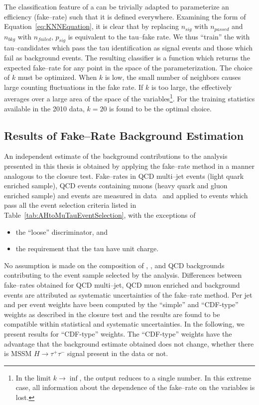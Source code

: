 The classification feature of a \kNN can be trivially adapted to parameterize an
efficiency (fake--rate) such that it is defined everywhere.  Examining the form
of Equation~\ref{eq:KNNEquation}, it is clear that by replacing $n_{sig}$ with
$n_{passed}$ and $n_{bkg}$ with $n_{failed}$, $p_{sig}$ is equivalent to the
tau--fake rate.  We thus ``train'' the \kNN with tau--candidates which pass the
tau identification as signal events and those which fail as background events.
The resulting classifier is a function which returns the expected fake--rate for
any point in the space of the parameterization.  The choice of $k$ must be
optimized.  When $k$ is low, the small number of neighbors causes large counting
fluctuations in the fake rate.  If $k$ is too large, the \kNN effectively
averages over a large area of the space of the variables\footnote{In the limit
$k\to\inf$, the \kNN output reduces to a single number.  In this extreme case,
all information about the dependence of the fake--rate on the variables is
lost.}.  For the training statistics available in the 2010 data, $k=20$ is found
to be the optimal choice.

\subsection{Results of Fake--Rate Background Estimation}
%
An independent estimate of the background contributions to the analysis
presented in this thesis is obtained by applying the fake--rate method in a
manner analogous to the closure test.  Fake--rates in QCD multi--jet events
(light quark enriched sample), QCD events containing muons (heavy quark and
gluon enriched sample) and \WpJets events are measured in
data~\cite{CMS-PAS-PFT-10-004,CMS-PAS-TAU-11-001} and applied to events which
pass all the event selection criteria listed in
Table~\ref{tab:AHtoMuTauEventSelection}, with the exceptions of 
\begin{itemize}
  \item the ``loose'' \hpsTanc discriminator, and
  \item the requirement that the tau have unit charge.
\end{itemize}

No assumption is made on the composition of \ZMM, \WpJets,
\ttbarpJets and QCD backgrounds contributing to the event sample selected
by the analysis.  Differences between fake--rates obtained for QCD multi--jet,
QCD muon enriched and \WpJets background events are attributed as systematic
uncertainties of the fake--rate method.  Per jet and per event weights have been
computed by the ``simple'' and ``CDF-type'' weights as described
in the closure test and the results are found to be compatible within
statistical and systematic uncertainties.  In the following, we present results
for ``CDF-type'' weights.  The ``CDF-type'' weights have the advantage that the
background estimate obtained does not change, whether there is MSSM $H \to
\tau^{+} \tau^{-}$ signal present in the data or not.

